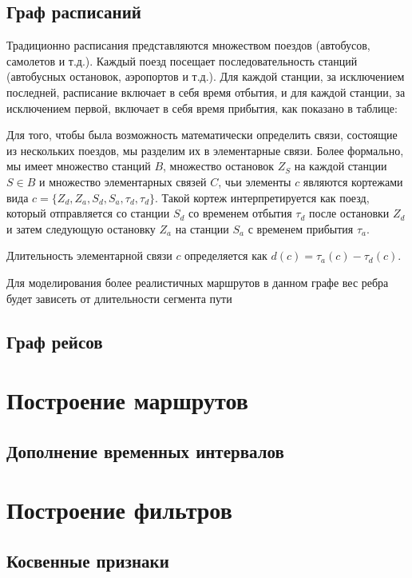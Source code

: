 \subsection{Граф расписаний}
Традиционно расписания представляются множеством поездов (автобусов, самолетов и т.д.). Каждый поезд посещает последовательность станций (автобусных остановок, аэропортов и т.д.). Для каждой станции, за исключением последней, расписание включает в себя время отбытия, и для каждой станции, за исключением первой, включает в себя время прибытия, как показано в таблице:

Для того, чтобы была возможность математически определить связи, состоящие из нескольких поездов, мы разделим их в элементарные связи. Более формально, мы имеет множество станций $B$, множество остановок $Z_S$ на каждой станции $S \in B$ и множество элементарных связей $C$, чьи элементы $c$ являются кортежами вида $c=\{Z_d,Z_a,S_d,S_a,\tau_d,\tau_d\}$. Такой кортеж интерпретируется как поезд, который отправляется со станции $S_d$ со временем отбытия $\tau_d$ после остановки $Z_d$ и затем следующую остановку $Z_a$ на станции $S_a$ с временем прибытия $\tau_a$.

\begin{definition}
	Длительность элементарной связи $c$ определяется как $d(c)=\tau_a(c)-\tau_d(c)$.
\end{definition}

Для моделирования более реалистичных маршрутов в данном графе вес ребра будет зависеть от длительности сегмента пути
\subsection{Граф рейсов}


\section{Построение маршрутов}

\subsection{Дополнение временных интервалов}

\section{Построение фильтров}

\subsection{Косвенные признаки}

